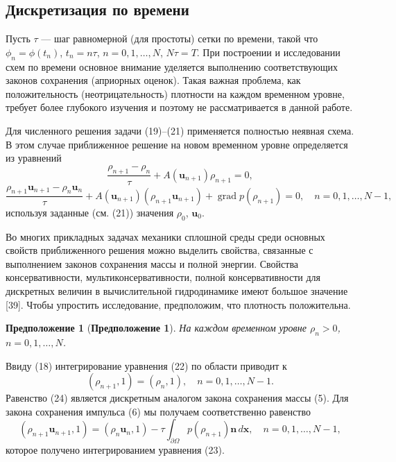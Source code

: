 \documentclass[10pt,twocolumn]{article}
\newtheorem{proposition}{Предположение}
\begin{document}
\subsection{Дискретизация по времени}

Пусть \(\tau\) — шаг равномерной (для простоты) сетки по времени, такой что \(\phi_{n} = \phi (t_{n})\), \(t_{n} = n\tau\), \(n = 0,1,\ldots ,N\), \(N\tau = T\). При построении и исследовании схем по времени основное внимание уделяется выполнению соответствующих законов сохранения (априорных оценок). Такая важная проблема, как положительность (неотрицательность) плотности на каждом временном уровне, требует более глубокого изучения и поэтому не рассматривается в данной работе.

Для численного решения задачи (19)--(21) применяется полностью неявная схема. В этом случае приближенное решение на новом временном уровне определяется из уравнений
\begin{equation}
\frac{\rho_{n + 1} - \rho_{n}}{\tau} +A(\mathbf{u}_{n + 1})\rho_{n + 1} = 0, \tag{22}
\end{equation}
\begin{equation}
\frac{\rho_{n + 1}\mathbf{u}_{n + 1} - \rho_{n}\mathbf{u}_{n}}{\tau} +A(\mathbf{u}_{n + 1})(\rho_{n + 1}\mathbf{u}_{n + 1}) + \operatorname{grad}p(\rho_{n + 1}) = 0, \quad n = 0,1,\ldots ,N - 1, \tag{23}
\end{equation}
используя заданные (см. (21)) значения \(\rho_{0}\), \(\mathbf{u}_{0}\).

Во многих прикладных задачах механики сплошной среды среди основных свойств приближенного решения можно выделить свойства, связанные с выполнением законов сохранения массы и полной энергии. Свойства консервативности, мультиконсервативности, полной консервативности для дискретных величин в вычислительной гидродинамике имеют большое значение [39]. Чтобы упростить исследование, предположим, что плотность положительна.

\begin{proposition}[\textbf{Предположение 1}]
На каждом временном уровне \(\rho_n > 0\), \(n = 0,1,\ldots ,N\).
\end{proposition}

Ввиду (18) интегрирование уравнения (22) по области приводит к
\begin{equation}
(\rho_{n + 1}, 1) = (\rho_{n}, 1),\quad n = 0,1,\ldots ,N-1. \tag{24}
\end{equation}
Равенство (24) является дискретным аналогом закона сохранения массы (5). Для закона сохранения импульса (6) мы получаем соответственно равенство
\begin{equation}
(\rho_{n + 1}\mathbf{u}_{n + 1}, 1) = (\rho_{n}\mathbf{u}_{n}, 1) -\tau\int_{\partial \Omega}p(\rho_{n + 1})\mathbf{n}\,d\mathbf{x},\quad n = 0,1,\ldots ,N-1, \tag{25}
\end{equation}
которое получено интегрированием уравнения (23).
\end{document}
